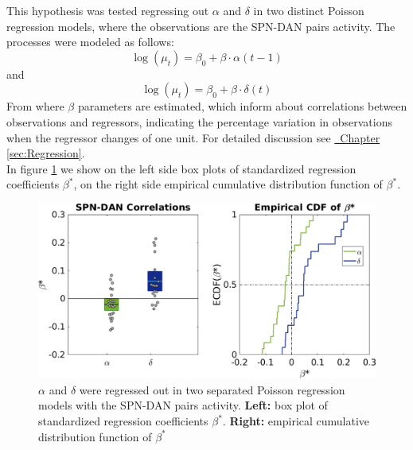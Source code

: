 This hypothesis was tested regressing out $\alpha$ and $\delta$ in two distinct Poisson regression models, where the observations are the SPN-DAN pairs activity. The processes were modeled as follows:
\begin{equation*}
    \log(\mu_t)=\beta_0+\beta\cdot\alpha(t-1)
\end{equation*}
and 
\begin{equation*}
    \log(\mu_t)=\beta_0+\beta\cdot\delta(t)
\end{equation*}
From where $\beta$ parameters are estimated, which inform about correlations between observations and regressors, indicating the percentage variation in observations when the regressor changes of one unit. For detailed discussion see \hyperref[sec:Regression]{~Chapter \ref*{sec:Regression}}.\\
In figure \ref{fig:RL_alphadelta} we show on the left side box plots of standardized regression coefficients $\beta^*$, on the right side empirical cumulative distribution function of $\beta^*$.\\
\begin{figure}
   \centering
    \includegraphics[scale=0.5]{figures/AlphaAndDeltaPavSPN3.png}
    \caption{$\alpha$ and $\delta$ were regressed out in two separated Poisson regression models with the SPN-DAN pairs activity. \textbf{Left:} box plot of standardized regression coefficients $\beta^*$. \textbf{Right:} empirical cumulative distribution function of $\beta^*$}
    \label{fig:RL_alphadelta}
\end{figure}
